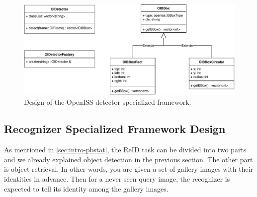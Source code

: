 \begin{figure}
    \centering
    \includegraphics[width=\linewidth]{figures/framework_sub_detector.pdf}
    \caption{Design of the OpenISS detector specialized framework.}
    \label{fig:fw-sub-detector}
\end{figure}

\subsection{Recognizer Specialized Framework Design}
\label{sec:fw-design-spec-recognizer}

As mentioned in \autoref{sec:intro-pbstat}, the ReID task can be divided
into two parts and we already explained object detection in the previous
section. The other part is object retrieval.
In other words, you are given a set of gallery images with their identities in
advance. Then for a never seen query image, the recognizer is expected to tell
its identity among the gallery images.

